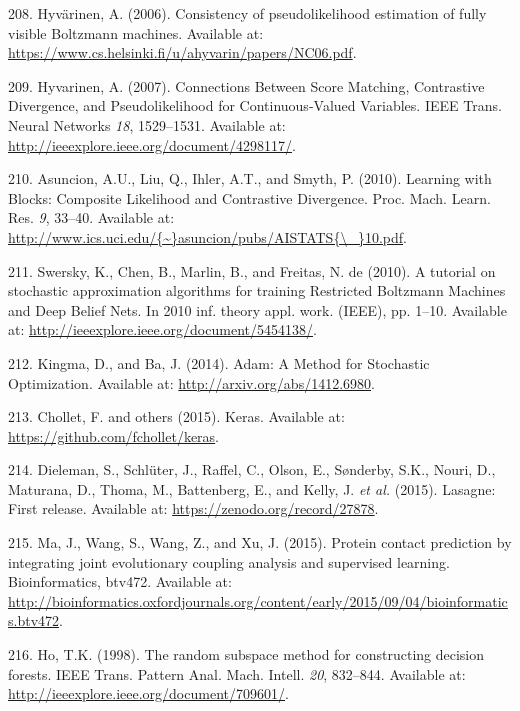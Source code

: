 \documentclass[11pt,a4paper,twoside]{book}
\theoremstyle{definition}
\theoremstyle{definition}
\theoremstyle{remark}
\begin{document}
\hypertarget{ref-Hyvarinen2006}{}
208. Hyvärinen, A. (2006). Consistency of pseudolikelihood estimation of
fully visible Boltzmann machines. Available at:
\url{https://www.cs.helsinki.fi/u/ahyvarin/papers/NC06.pdf}.

\hypertarget{ref-Hyvarinen2007}{}
209. Hyvarinen, A. (2007). Connections Between Score Matching,
Contrastive Divergence, and Pseudolikelihood for Continuous-Valued
Variables. IEEE Trans. Neural Networks \emph{18}, 1529--1531. Available
at: \url{http://ieeexplore.ieee.org/document/4298117/}.

\hypertarget{ref-Asuncion2010}{}
210. Asuncion, A.U., Liu, Q., Ihler, A.T., and Smyth, P. (2010).
Learning with Blocks: Composite Likelihood and Contrastive Divergence.
Proc. Mach. Learn. Res. \emph{9}, 33--40. Available at:
\href{http://www.ics.uci.edu/\%7B~\%7Dasuncion/pubs/AISTATS\%7B/_\%7D10.pdf}{http://www.ics.uci.edu/\{\textasciitilde{}\}asuncion/pubs/AISTATS\{\textbackslash{}\_\}10.pdf}.

\hypertarget{ref-Swersky2010}{}
211. Swersky, K., Chen, B., Marlin, B., and Freitas, N. de (2010). A
tutorial on stochastic approximation algorithms for training Restricted
Boltzmann Machines and Deep Belief Nets. In 2010 inf. theory appl. work.
(IEEE), pp. 1--10. Available at:
\url{http://ieeexplore.ieee.org/document/5454138/}.

\hypertarget{ref-Kingma2014}{}
212. Kingma, D., and Ba, J. (2014). Adam: A Method for Stochastic
Optimization. Available at: \url{http://arxiv.org/abs/1412.6980}.

\hypertarget{ref-Chollet2015}{}
213. Chollet, F. and others (2015). Keras. Available at:
\url{https://github.com/fchollet/keras}.

\hypertarget{ref-Dieleman2015}{}
214. Dieleman, S., Schlüter, J., Raffel, C., Olson, E., Sønderby, S.K.,
Nouri, D., Maturana, D., Thoma, M., Battenberg, E., and Kelly, J.
\emph{et al.} (2015). Lasagne: First release. Available at:
\url{https://zenodo.org/record/27878}.

\hypertarget{ref-Ma2015a}{}
215. Ma, J., Wang, S., Wang, Z., and Xu, J. (2015). Protein contact
prediction by integrating joint evolutionary coupling analysis and
supervised learning. Bioinformatics, btv472. Available at:
\url{http://bioinformatics.oxfordjournals.org/content/early/2015/09/04/bioinformatics.btv472}.

\hypertarget{ref-Ho1998}{}
216. Ho, T.K. (1998). The random subspace method for constructing
decision forests. IEEE Trans. Pattern Anal. Mach. Intell. \emph{20},
832--844. Available at:
\url{http://ieeexplore.ieee.org/document/709601/}.
\end{document}
